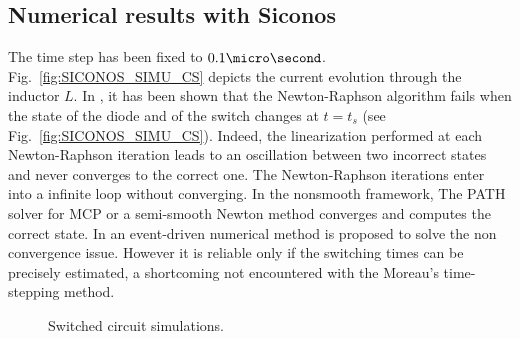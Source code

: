 \subsection{Numerical results with {\sc Siconos}}
\label{section32}

The time step has been fixed to $0.1 \micro \second$. Fig.~\ref{fig:SICONOS_SIMU_CS} depicts
the current evolution through the inductor $L$. In \cite{maffezzoni2006}, it has been shown that the
Newton-Raphson algorithm fails when the state of the diode and of the switch changes at $t=t_s$ (see
Fig.~\ref{fig:SICONOS_SIMU_CS}). Indeed, the linearization performed at each Newton-Raphson
iteration leads to an oscillation between two incorrect states and never converges to the correct
one. The Newton-Raphson iterations enter into a infinite loop without converging. In the nonsmooth framework, The PATH solver\cite{Dirkse.Ferris1995} for MCP or a semi-smooth Newton method\cite{DeLuca.Facchinei.ea2000}  converges and computes the correct state. In \cite{maffezzoni2006} an event-driven numerical method is proposed to solve the non convergence issue. However it is reliable only if the switching times can be precisely estimated, a shortcoming not encountered  with the  Moreau's time-stepping method. 
\begin{figure*}[!ht]
  \hspace{-2mm}
 \caption{Switched circuit simulations.}
\label{figSimuCS}
\end{figure*}
